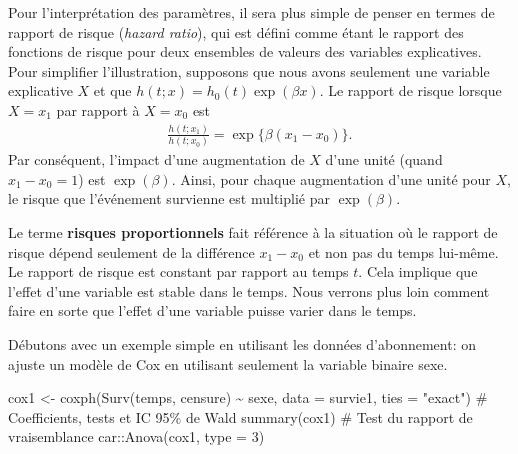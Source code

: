 \documentclass[
  11pt,
  letterpaper,
]{scrbook}
\newenvironment{Shaded}{\begin{snugshade}}{\end{snugshade}}
\newcommand{\AttributeTok}[1]{\textcolor[rgb]{0.40,0.45,0.13}{#1}}
\newcommand{\CommentTok}[1]{\textcolor[rgb]{0.37,0.37,0.37}{#1}}
\newcommand{\DecValTok}[1]{\textcolor[rgb]{0.68,0.00,0.00}{#1}}
\newcommand{\FunctionTok}[1]{\textcolor[rgb]{0.28,0.35,0.67}{#1}}
\newcommand{\NormalTok}[1]{\textcolor[rgb]{0.00,0.23,0.31}{#1}}
\newcommand{\OtherTok}[1]{\textcolor[rgb]{0.00,0.23,0.31}{#1}}
\newcommand{\SpecialCharTok}[1]{\textcolor[rgb]{0.37,0.37,0.37}{#1}}
\newcommand{\StringTok}[1]{\textcolor[rgb]{0.13,0.47,0.30}{#1}}
\theoremstyle{definition}
\theoremstyle{remark}
\begin{document}
Pour l'interprétation des paramètres, il sera plus simple de penser en
termes de rapport de risque (\emph{hazard ratio}), qui est défini comme
étant le rapport des fonctions de risque pour deux ensembles de valeurs
des variables explicatives. Pour simplifier l'illustration, supposons
que nous avons seulement une variable explicative \(X\) et que
\(h(t; x) = h_0(t)\exp(\beta x)\). Le rapport de risque lorsque
\(X=x_1\) par rapport à \(X=x_0\) est \begin{align*}
\frac{h(t; x_1)}{h(t; x_0)} = \exp\{\beta(x_1-x_0)\}.
\end{align*} Par conséquent, l'impact d'une augmentation de \(X\) d'une
unité (quand \(x_1-x_0=1\)) est \(\exp(\beta)\). Ainsi, pour chaque
augmentation d'une unité pour \(X\), le risque que l'événement survienne
est multiplié par \(\exp(\beta)\).

Le terme \textbf{risques proportionnels} fait référence à la situation
où le rapport de risque dépend seulement de la différence \(x_1-x_0\) et
non pas du temps lui-même. Le rapport de risque est constant par rapport
au temps \(t\). Cela implique que l'effet d'une variable est stable dans
le temps. Nous verrons plus loin comment faire en sorte que l'effet
d'une variable puisse varier dans le temps.

Débutons avec un exemple simple en utilisant les données d'abonnement:
on ajuste un modèle de Cox en utilisant seulement la variable binaire
sexe.

\begin{Shaded}
\begin{Highlighting}[]
\NormalTok{cox1 }\OtherTok{\textless{}{-}} \FunctionTok{coxph}\NormalTok{(}\FunctionTok{Surv}\NormalTok{(temps, censure) }\SpecialCharTok{\textasciitilde{}}\NormalTok{ sexe, }
              \AttributeTok{data =}\NormalTok{ survie1,}
              \AttributeTok{ties =} \StringTok{"exact"}\NormalTok{)}
\CommentTok{\# Coefficients, tests et IC 95\% de Wald}
\FunctionTok{summary}\NormalTok{(cox1)}
\CommentTok{\# Test du rapport de vraisemblance}
\NormalTok{car}\SpecialCharTok{::}\FunctionTok{Anova}\NormalTok{(cox1, }\AttributeTok{type =} \DecValTok{3}\NormalTok{)}
\end{Highlighting}
\end{Shaded}
\end{document}
